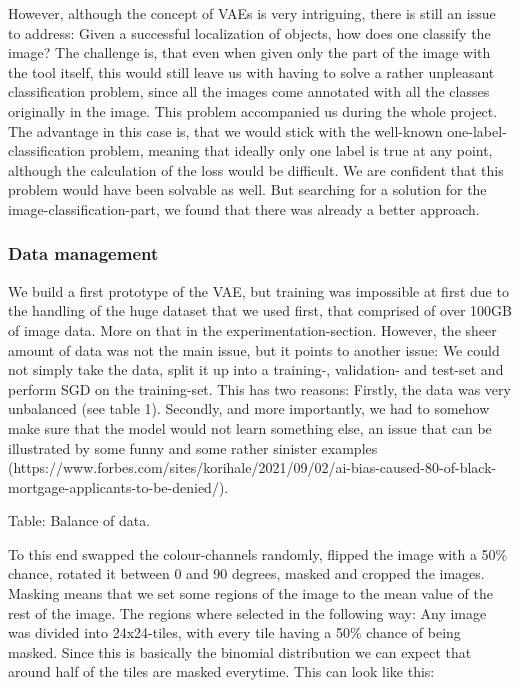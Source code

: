 However, although the concept of VAEs is very intriguing, there is still an issue to address: Given a successful localization of objects, how does one classify the image?
The challenge is, that even when given only the part of the image with the tool itself, this would still leave us with having to solve a rather unpleasant classification problem, since all the images come annotated with all the classes originally in the image. This problem accompanied us during the whole project. The advantage in this case is, that we would stick with the well-known one-label-classification problem, meaning that ideally only one label is true at any point, although the calculation of the loss would be difficult. We are confident that this problem would have been solvable as well. But searching for a solution for the image-classification-part, we found that there was already a better approach.

\subsubsection{Data management}

We build a first prototype of the VAE, but training was impossible at first due to the handling of the huge dataset that we used first, that comprised of over 100GB of image data. More on that in the experimentation-section. However, the sheer amount of data was not the main issue, but it points to another issue: We could not simply take the data, split it up into a training-, validation- and test-set and perform SGD on the training-set. 
This has two reasons: Firstly, the data was very unbalanced (see table 1). Secondly, and more importantly, we had to somehow make sure that the model would not learn something else, an issue that can be illustrated by some funny and some rather sinister examples (https://www.forbes.com/sites/korihale/2021/09/02/ai-bias-caused-80-of-black-mortgage-applicants-to-be-denied/).

Table: Balance of data.

To this end swapped the colour-channels randomly, flipped the image with a 50\% chance, rotated it between 0 and 90 degrees, masked and cropped the images. Masking means that we set some regions of the image to the mean value of the rest of the image. The regions where selected in the following way: Any image was divided into 24x24-tiles, with every tile having a 50\% chance of being masked. Since this is basically the binomial distribution we can expect that around half of the tiles are masked everytime. This can look like this:

